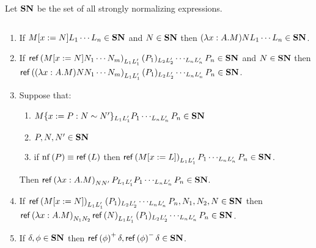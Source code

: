
Let $\mathbf{SN}$ be the set of all strongly normalizing expressions.

\begin{lemma}
\label{lm:SN}
$ $
\begin{enumerate}
\item
\label{lm:SN1}
If $M[x:=N]L_1 \cdots L_n \in \mathbf{SN}$ and $N \in \mathbf{SN}$ then $(\lambda x:A.M)NL_1 \cdots L_n \in \mathbf{SN}$.
\item
\label{lm:SN2}
If $\mathsf{ref} \left( {M[x:=N]N_1 \cdots N_m} \right)_{L_1 L_1'} (P_1)_{L_2 L_2'} \cdots_{L_n L_n'} P_n \in \mathbf{SN}$ and $N \in \mathbf{SN}$ then
$\mathsf{ref} \left( {(\lambda x:A.M)NN_1 \cdots N_m} \right)_{L_1 L_1'} (P_1)_{L_2 L_2'} \cdots_{L_n L_n'} P_n \in \mathbf{SN}$.
\item
\label{lm:SN3}
Suppose that:
\begin{enumerate}
\item
\label{hypi}
$M\{x:=P:N\sim N'\}_{L_1 L_1'} P_1 \cdots_{L_n L_n'} P_n \in \mathbf{SN}$
\item
$P, N, N' \in \mathbf{SN}$
\item
\label{hypiii}
if $\mathrm{nf} \left( {P} \right) \equiv \mathsf{ref} \left( {L} \right)$ then $\mathsf{ref} \left( {M[x:=L]} \right)_{L_1 L_1'} P_1 \cdots_{L_n L_n'} P_n \in \mathbf{SN}$.
\end{enumerate}
Then $\mathsf{ref} \left( {\lambda x:A.M} \right)_{N N'} P_{L_1 L_1'} P_1 \cdots_{L_n L_n'} P_n \in \mathbf{SN}$.
\item
\label{lm:SN4}
If $\mathsf{ref} \left( {M[x:=N]} \right)_{L_1 L_1'} (P_1)_{L_2 L_2'} \cdots_{L_n L_n'} P_n, N_1, N_2, N \in \mathbf{SN}$ then \\
$\mathsf{ref} \left( {\lambda x:A.M} \right)_{N_1 N_2}\mathsf{ref} \left( {N} \right)_{L_1 L_1'} (P_1)_{L_2 L_2'} \cdots_{L_n L_n'} P_n \in \mathbf{SN}$.
\item
\label{lm:SN5}
If $\delta, \phi \in \mathbf{SN}$ then $\mathsf{ref} \left( {\phi} \right)^+ \delta, \mathsf{ref} \left( {\phi} \right)^- \delta \in \mathbf{SN}$.
\end{enumerate}
\end{lemma}

